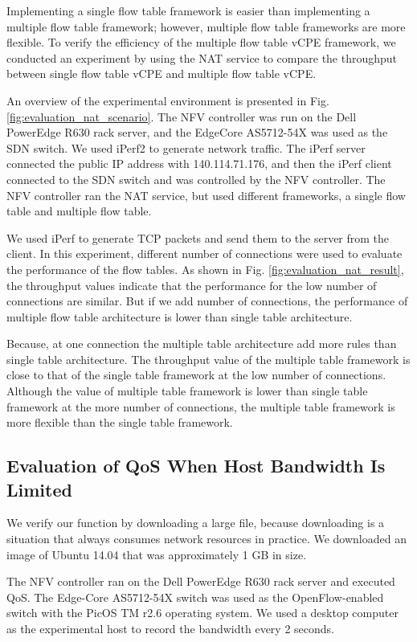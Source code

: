 \documentclass[conference]{IEEEtran}
\begin{document}
Implementing a single flow table framework is easier than implementing a multiple flow table framework; however, multiple flow table frameworks are more flexible. To verify the efficiency of the multiple flow table vCPE framework, we conducted an experiment by using the NAT service to compare the throughput between single flow table vCPE and multiple flow table vCPE.

An overview of the experimental environment is presented in Fig. \ref{fig:evaluation_nat_scenario}. The NFV controller was run on the Dell PowerEdge R630 rack server, and the EdgeCore AS5712-54X \cite{edge-core-switch} was used as the SDN switch.
We used iPerf2 \cite{iperf} to generate network traffic. The iPerf server connected the public IP address with 140.114.71.176, and then the iPerf client connected to the SDN switch and was controlled by the NFV controller.
The NFV controller ran the NAT service, but used different frameworks, a single flow table and multiple flow table.

We used iPerf to generate TCP packets and send them to the server from the client.
In this experiment, different number of connections were used to evaluate the performance of the flow tables.
As shown in Fig. \ref{fig:evaluation_nat_result}, the throughput values indicate that the performance for the low number of connections are similar.
But if we add number of connections, the performance of multiple flow table architecture is lower than single table architecture.

Because, at one connection the multiple table architecture add more rules than single table architecture.
The throughput value of the multiple table framework is close to that of the single table framework at the low number of connections.
Although the value of multiple table framework is lower than single table framework at the more number of connections, the multiple table framework is more flexible than the single table framework.



\subsection{Evaluation of QoS When Host Bandwidth Is Limited}

We verify our function by downloading a large file, because downloading is a situation that always consumes network resources in practice.
We downloaded an image of Ubuntu 14.04 that was approximately 1 GB in size.

The NFV controller ran on the Dell PowerEdge R630 rack server and executed QoS.
The Edge-Core AS5712-54X \cite{edge-core-switch} switch was used as the OpenFlow-enabled switch with the PicOS TM r2.6 operating system.
We used a desktop computer as the experimental host to record the bandwidth every 2 seconds.
\end{document}
